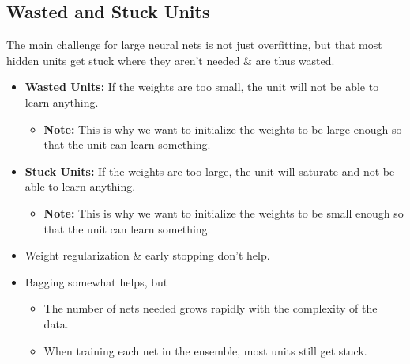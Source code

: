 \subsection{Wasted and Stuck Units}
\begin{summary}
    The main challenge for large neural nets is not just overfitting, but that most hidden units get \underline{stuck where they aren't needed} \& are thus \underline{wasted}.
    \begin{itemize}
        \item \textbf{Wasted Units:} If the weights are too small, the unit will not be able to learn anything.
        \begin{itemize}
            \item \textbf{Note:} This is why we want to initialize the weights to be large enough so that the unit can learn something.
        \end{itemize}
        \item \textbf{Stuck Units:} If the weights are too large, the unit will saturate and not be able to learn anything.
        \begin{itemize}
            \item \textbf{Note:} This is why we want to initialize the weights to be small enough so that the unit can learn something.
        \end{itemize}
    \end{itemize}
    \vspace{1em}
    
    \begin{itemize}
        \item Weight regularization \& early stopping don't help.
        \item Bagging somewhat helps, but
        \begin{itemize}
            \item The number of nets needed grows rapidly with the complexity of the data.
            \item When training each net in the ensemble, most units still get stuck.
        \end{itemize}
    \end{itemize}
\end{summary}

